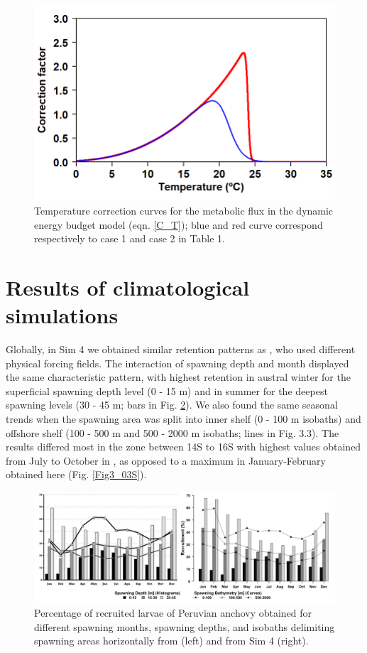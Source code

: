 \begin{figure}[ht]
	\includegraphics[width=1.0\textwidth]{figures/Fig3_02.png}
	\centering
	\caption{Temperature correction curves for the metabolic flux in the dynamic energy budget model (eqn. \ref{C_T}); blue and red curve correspond respectively to case 1 and case 2 in Table 1.}
	\label{Fig3_02}
\end{figure}

\clearpage
\section{Results of climatological simulations}\label{Chap3Resu1}

Globally, in Sim 4 we obtained similar retention patterns as \cite{BrocLett2008}, who used different physical forcing fields. The interaction of spawning depth and month displayed the same characteristic pattern, with highest retention in austral winter for the superficial spawning depth level (0 - 15 m) and in summer for the deepest spawning levels (30 - 45 m; bars in Fig. \ref{Fig3_03}). We also found the same seasonal trends when the spawning area was split into inner shelf (0 - 100 m isobaths) and offshore shelf (100 - 500 m and 500 - 2000 m isobaths; lines in Fig. 3.3). The results differed most in the zone between 14\textdegree S to 16\textdegree S with highest values obtained from July to October in \cite{BrocLett2008}, as opposed to a maximum in January-February obtained here (Fig. \ref{Fig3_03S}).\\

\begin{figure}[ht]
	\includegraphics[width=1.0\textwidth]{figures/Fig3_03.png}
	\centering
	\caption{Percentage of recruited larvae of Peruvian anchovy obtained for different spawning months, spawning depths, and isobaths delimiting spawning areas horizontally from \cite{BrocLett2008} (left) and from Sim 4 (right).}
	\label{Fig3_03}
\end{figure}

